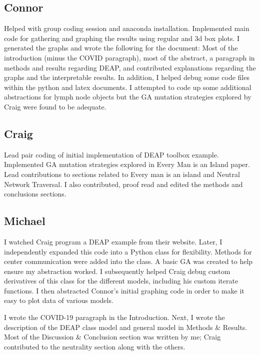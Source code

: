 \documentclass[conference]{IEEEtran}
\begin{document}
\subsection{Connor} Helped with group coding session and anaconda installation. Implemented main code for gathering and graphing the results using regular and 3d box plots. I generated the graphs and wrote the following for the document: Most of the introduction (minus the COVID paragraph), most of the abstract, a paragraph in methods and results regarding DEAP, and contributed explanations regarding the graphs and the interpretable results. In addition, I helped debug some code files within the python and latex documents. I attempted to code up some additional abstractions for lymph node objects but the GA mutation strategies explored by Craig were found to be adequate. 

\subsection{Craig} Lead pair coding of initial implementation of DEAP toolbox example. Implemented GA mutation strategies explored in Every Man is an Island paper. Lead contributions to sections related to Every man is an island and Neutral Network Traversal. I also contributed, proof read and edited the methods and conclusions sections. 

\subsection{Michael} I watched Craig program a DEAP example from their website. Later, I independently expanded this code into a Python class for flexibility. Methods for center communication were added into the class. A basic GA was created to help ensure my abstraction worked. I subsequently helped Craig debug custom derivatives of this class for the different models, including his custom iterate functions. I then abstracted Connor's initial graphing code in order to make it easy to plot data of various models.

I wrote the COVID-19 paragraph in the Introduction. Next, I wrote the description of the DEAP class model and general model in Methods \& Results. Most of the Discussion \& Conclusion section was written by me; Craig contributed to the neutrality section along with the others.




\end{document}
